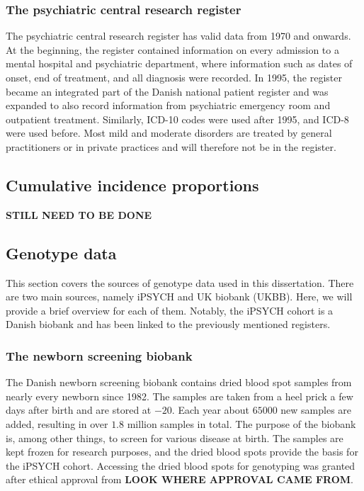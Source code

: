 \subsubsection{The psychiatric central research register}
The psychiatric central research register has valid data from 1970 and onwards. At the beginning, the register contained information on every admission to a mental hospital and psychiatric department, where information such as dates of onset, end of treatment, and all diagnosis were recorded. In 1995, the register became an integrated part of the Danish national patient register and was expanded to also record information from psychiatric emergency room and outpatient treatment. Similarly, ICD-10 codes were used after 1995, and ICD-8 were used before. Most mild and moderate disorders are treated by general practitioners or in private practices and will therefore not be in the register.\cite{mors2011danish}


\subsection{Cumulative incidence proportions}
\textbf{STILL NEED TO BE DONE}

\subsection{Genotype data}
This section covers the sources of genotype data used in this dissertation. There are two main sources, namely iPSYCH and UK biobank (UKBB). Here, we will provide a brief overview for each of them. Notably, the iPSYCH cohort is a Danish biobank and has been linked to the previously mentioned registers. 

\subsubsection{The newborn screening biobank}
The Danish newborn screening biobank contains dried blood spot samples from nearly every newborn since 1982. The samples are taken from a heel prick a few days after birth and are stored at $ -20 $\textcelsius. Each year about $ 65000 $ new samples are added, resulting in over $ 1.8 $ million samples in total. The purpose of the biobank is, among other things, to screen for various disease at birth. The samples are kept frozen for research purposes, and the dried blood spots provide the basis for the iPSYCH cohort. Accessing the dried blood spots for genotyping was granted after ethical approval from \textbf{LOOK WHERE APPROVAL CAME FROM}. \cite{norgaard2007storage}

